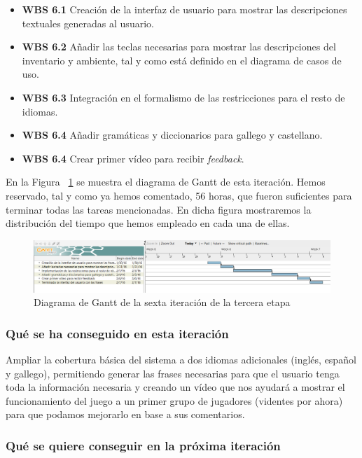 \begin{itemize}
  \item \textbf{WBS 6.1} Creación de la interfaz de usuario para mostrar las descripciones textuales generadas al usuario.
  \item \textbf{WBS 6.2} Añadir las teclas necesarias para mostrar las descripciones del inventario y ambiente, tal y como está definido en el diagrama de casos de uso.
  \item \textbf{WBS 6.3} Integración en el formalismo de las restricciones para el resto de idiomas.
  \item \textbf{WBS 6.4} Añadir gramáticas y diccionarios para gallego y castellano.
  \item \textbf{WBS 6.4} Crear primer vídeo para recibir \textit{feedback}.
\end{itemize}

\noindent En la Figura ~\ref{fig:sec3it6} se muestra el diagrama de Gantt de esta iteración. Hemos reservado, tal y como ya hemos comentado, 56 horas, que fueron suficientes para terminar todas las tareas mencionadas. En dicha figura mostraremos la distribución del tiempo que hemos empleado en cada una de ellas.

\begin{figure}
    \includegraphics[width=\textwidth,height=\textheight,keepaspectratio]{./img/sec3it6.png}
  \caption{Diagrama de Gantt de la sexta iteración de la tercera etapa}
  \label{fig:sec3it6}
\end{figure}

\subsubsection{Qué se ha conseguido en esta iteración}

Ampliar la cobertura básica del sistema a dos idiomas adicionales (inglés, español y gallego), permitiendo generar las frases necesarias para que el usuario tenga toda la información necesaria y creando un vídeo que nos ayudará a mostrar el funcionamiento del juego a un primer grupo de jugadores (videntes por ahora) para que podamos mejorarlo en base a sus comentarios.

\subsubsection{Qué se quiere conseguir en la próxima iteración}

